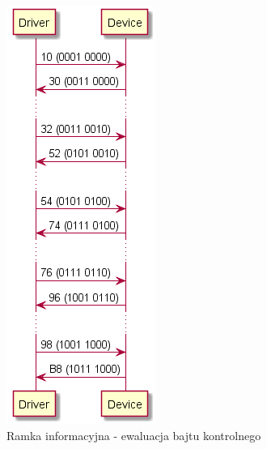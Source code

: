\begin{figure}[h!]
\centering
\includegraphics[scale=1.0]{out/FrameI_Bajt_kontrolny/FrameI_Bajt_kontrolny.png}
\caption{Ramka informacyjna - ewaluacja bajtu kontrolnego}
\end{figure}
